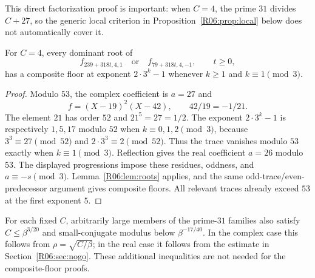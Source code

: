 \documentclass[11pt,a4paper]{article}
\theoremstyle{definition}\newtheorem{definition}[theorem]{Definition}
\theoremstyle{remark}\newtheorem{remark}[theorem]{Remark}
\begin{document}
This direct factorization proof is important: when $C=4$, the prime
$31$ divides $C+27$, so the generic local criterion in
Proposition~\ref{R06:prop:local} below does not automatically cover it.

\begin{proposition}\label{R06:prop:53}
For $C=4$, every dominant root of
\[
 f_{239+318t,4,1}\quad\text{or}\quad f_{79+318t,4,-1},\qquad t\ge0,
\]
has a composite floor at exponent $2\cdot3^k-1$ whenever
$k\ge1$ and $k\equiv1\pmod3$.
\end{proposition}
\begin{proof}
Modulo $53$, the complex coefficient is $a=27$ and
\[
 f=(X-19)^2(X-42),\qquad 42/19=-1/21.
\]
The element $21$ has order $52$ and $21^5=27=1/2$.
The exponent $2\cdot3^k-1$ is respectively $1,5,17$ modulo $52$
when $k\equiv0,1,2\pmod3$, because $3^3\equiv27\pmod{52}$ and
$2\cdot3^3\equiv2\pmod{52}$.
Thus the trace vanishes modulo $53$ exactly when $k\equiv1\pmod3$.
Reflection gives the real coefficient $a=26$ modulo $53$.
The displayed progressions impose these residues, oddness, and
$a\equiv-s\pmod3$. Lemma~\ref{R06:lem:roots} applies, and the same
odd-trace/even-predecessor argument gives composite floors.
All relevant traces already exceed $53$ at the first exponent $5$.
\end{proof}

For each fixed $C$, arbitrarily large members of the prime-$31$
families also satisfy $C\le\beta^{3/20}$ and small-conjugate modulus
below $\beta^{-17/40}$. In the complex case this follows from
$\rho=\sqrt{C/\beta}$; in the real case it follows from the estimate
in Section~\ref{R06:sec:nogo}. These additional inequalities are not
needed for the composite-floor proofs.
\end{document}
